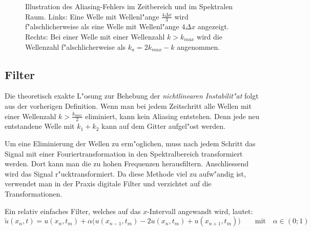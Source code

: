 \begin{refsection}
\begin{figure}
\begin{minipage}{0.45\textwidth}
\end{minipage}
\caption{Illustration des Aliasing-Fehlers im Zeitbereich und im
Spektralen Raum.
Links: Eine Welle mit Wellenl"ange $\frac{4 \Delta x}{3}$ wird
f"alschlicherweise als eine Welle mit Wellenl"ange $4\Delta x$ angezeigt.
Rechts: Bei einer Welle mit einer Wellenzahl $k\!>\!k_{max}$ wird die
Wellenzahl f"alschlicherweise als $k_{a}\!=\!2k_{max}\!-\!k$ angenommen.
\label{stosswellen:aliasing}	
}
\end{figure}
 

\subsection{Filter}
\label{stosswellen:loesung}
Die theoretisch exakte L"osung zur Behebung der \textit{nichtlinearen
Instabilit"at} folgt aus der vorherigen Definition. Wenn man bei jedem
Zeitschritt alle Wellen mit einer Wellenzahl $k > \frac{k_{max}}{2}$
eliminiert, kann kein Aliasing entstehen. Denn jede neu entstandene
Welle mit $k_{1}\!+\!k_{2}$ kann auf dem Gitter aufgel"ost werden. 

Um eine Eliminierung der Wellen zu erm"oglichen, muss nach jedem Schritt
das Signal mit einer Fouriertransformation in den Spektralbereich
transformiert werden. Dort kann man die zu hohen Frequenzen
herausfiltern. Anschliessend wird das Signal r"ucktransformiert. Da diese
Methode viel zu aufw"andig ist, verwendet man in der Praxis digitale
Filter und verzichtet auf die Transformationen.

Ein relativ einfaches Filter, welches auf das $x$-Intervall angewandt
wird, lautet:
\begin{equation}
\tilde{u}(x_n,t) = u(x_n,t_m) + \alpha \Big(u(x_{n-1},t_m)-2 u(x_n,t_m) + u(x_{n+1},t_m)\Big) \qquad \text{mit} \quad \alpha \in (0;1)
\end{equation}


\end{refsection}
